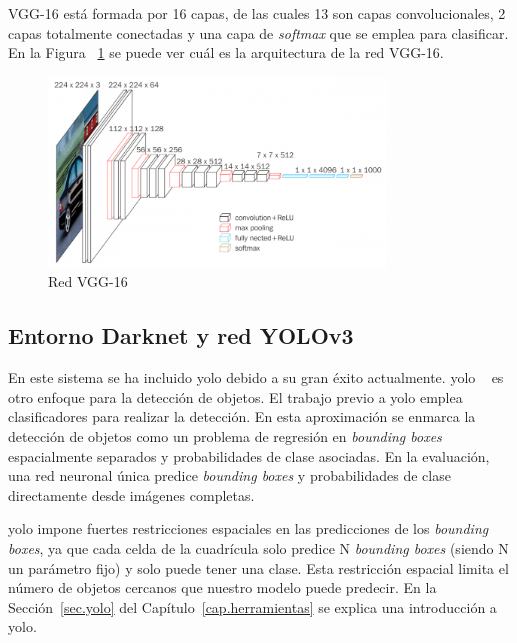 VGG-16  está formada por 16 capas, de las cuales 13 son capas convolucionales, 2 capas totalmente conectadas y una capa de \textit{softmax} que se emplea para clasificar. En la Figura ~\ref{fig.vgg16} se puede ver cuál es la arquitectura de la red VGG-16.

 \begin{figure}[H] 
\begin{center}
	\includegraphics[width=0.8\textwidth]{figures/Diseno_global/vgg16.png}
   \caption{Red VGG-16}
	\label{fig.vgg16}
\end{center}
\end{figure}

\subsection{Entorno Darknet y red YOLOv3}\label{sub.darknet}

En este sistema se ha incluido \acrfull{yolo} debido a su gran éxito actualmente. \acrshort{yolo} ~\cite{yolo_article1} es otro enfoque para la detección de objetos. El trabajo previo a \acrshort{yolo} emplea clasificadores para realizar la detección. En esta aproximación se enmarca la detección de objetos como un problema de regresión en \textit{bounding boxes} espacialmente separados y probabilidades de clase asociadas. En la evaluación, una red neuronal única predice \textit{bounding boxes} y probabilidades de clase directamente desde imágenes completas. 

\acrshort{yolo} impone fuertes restricciones espaciales en las predicciones de los \textit{bounding boxes}, ya que cada celda de la cuadrícula solo predice N \textit{bounding boxes} (siendo N un parámetro fijo) y solo puede tener una clase. Esta restricción espacial limita el número de objetos cercanos que nuestro modelo puede predecir. En la Sección~\ref{sec.yolo} del Capítulo~\ref{cap.herramientas} se explica una introducción a \acrshort{yolo}.

